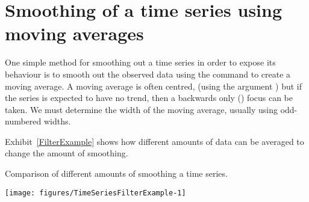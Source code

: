 \section{Smoothing of a time series using moving averages} 
 
One simple method for smoothing out a time series in order to expose its behaviour is to smooth out the observed data using  the  command to create a moving average. 
A moving average is often centred, (using the argument ) but if the series is expected to have no trend, then a backwards only ()  focus can be taken. We must determine the width of the moving average, usually using odd-numbered widths. 
 
Exhibit~\ref{FilterExample} shows how different amounts of data can be averaged to change the amount of smoothing. 
\begin{exhibit} 
\begin{center} 
\caption{Comparison of different amounts of smoothing a time series.} 
\label{FilterExample} 
\begin{knitrout}
\color{fgcolor}\begin{kframe}
\begin{alltt}
\hlstd{> }
\end{alltt}
\end{kframe}
\texttt{[image: figures/TimeSeriesFilterExample-1]} 
\begin{kframe}\begin{alltt}
\hlstd{> }  \hlopt{:}\hlstd{)\{}
\hlstd{   }\hlkwb{=}\hlopt{*}\hlopt{-} 
\hlstd{   }\hlstd{( (}\hlstd{(Nile)[}\hlstd{])}\hlopt{:}\hlstd{(Nile)[}\hlstd{],}  \hlstd{(}\hlopt{/} \hlstd{=}\hlstd{),} \hlopt{+}\hlstd{)}
\hlstd{   }\hlstd{\}}
\end{alltt}


{\ttfamily\noindent\bfseries{}}\end{kframe}
\end{knitrout}
\end{center} 
\end{exhibit} 
 
